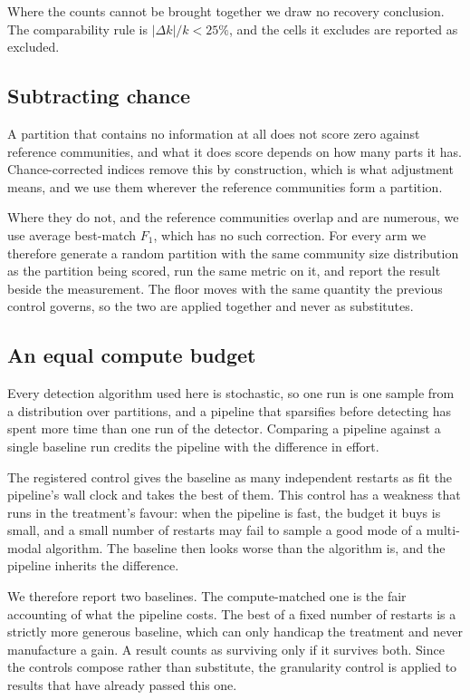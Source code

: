 Where the counts cannot be brought together we draw no recovery conclusion. The
comparability rule is $|\Delta k|/k < 25\%$, and the cells it excludes are
reported as excluded.

\subsection{Subtracting chance}\label{sec:protocol:chance}

A partition that contains no information at all does not score zero against
reference communities, and what it does score depends on how many parts it has.
Chance-corrected indices remove this by construction, which is what adjustment
means, and we use them wherever the reference communities form a partition.

Where they do not, and the reference communities overlap and are numerous, we use
average best-match $F_1$, which has no such correction. For every arm we
therefore generate a random partition with the same community size distribution
as the partition being scored, run the same metric on it, and report the result
beside the measurement. The floor moves with the same quantity the previous
control governs, so the two are applied together and never as substitutes.

\subsection{An equal compute budget}\label{sec:protocol:compute}

Every detection algorithm used here is stochastic, so one run is one sample from
a distribution over partitions, and a pipeline that sparsifies before detecting
has spent more time than one run of the detector. Comparing a pipeline against a
single baseline run credits the pipeline with the difference in effort.

The registered control gives the baseline as many independent restarts as fit the
pipeline's wall clock and takes the best of them. This control has a weakness
that runs in the treatment's favour: when the pipeline is fast, the budget it
buys is small, and a small number of restarts may fail to sample a good mode of a
multi-modal algorithm. The baseline then looks worse than the algorithm is, and
the pipeline inherits the difference.

We therefore report two baselines. The compute-matched one is the fair accounting
of what the pipeline costs. The best of a fixed number of restarts is a strictly
more generous baseline, which can only handicap the treatment and never
manufacture a gain. A result counts as surviving only if it survives both. Since
the controls compose rather than substitute, the granularity control is applied
to results that have already passed this one.

